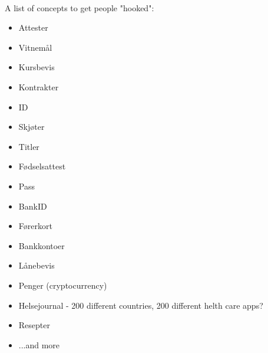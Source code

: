 \paragraph{}
A list of concepts to get people "hooked":
\begin{itemize}
    \item Attester
    \item Vitnemål
    \item Kursbevis
    \item Kontrakter
    \item ID
    \item Skjøter
    \item Titler
    \item Fødselsattest
    \item Pass
    \item BankID
    \item Førerkort
    \item Bankkontoer
    \item Lånebevis
    \item Penger (cryptocurrency)
    \item Helsejournal - 200 different countries, 200 different helth care apps?
    \item Resepter
    \item ...and more
\end{itemize}

